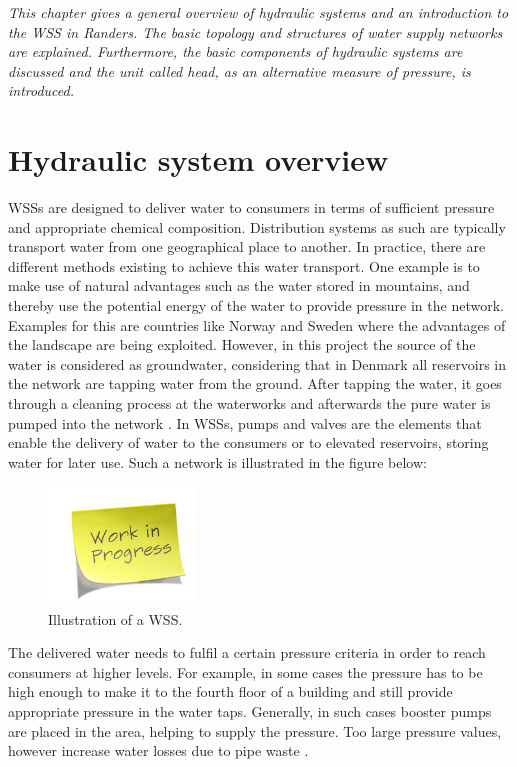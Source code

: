 \emph{This chapter gives a general overview of hydraulic systems and an introduction to the WSS in Randers. The basic topology and structures of water supply networks are explained. Furthermore, the basic components of hydraulic systems are discussed and the unit called head, as an alternative measure of pressure, is introduced.}

\section{Hydraulic system overview}
\label{hydraulic_system_overview}

WSSs are designed to deliver water to consumers in terms of sufficient pressure and appropriate chemical composition. Distribution systems as such are typically transport water from one geographical place to another. In practice, there are different methods existing to achieve this water transport. One example is to make use of natural advantages such as the water stored in mountains, and thereby use the potential energy of the water to provide pressure in the network. Examples for this are countries like Norway and Sweden where the advantages of the landscape are being exploited. However, in this project the source of the water is considered as groundwater, considering that in Denmark all reservoirs in the network are tapping water from the ground. After tapping the water, it goes through a cleaning process at the waterworks and afterwards the pure water is pumped into the network \cite{prahata}. In WSSs, pumps and valves are the elements that enable the delivery of water to the consumers or to elevated reservoirs, storing water for later use. Such a network is illustrated in the figure below: 

\begin{figure}[H]
\centering
\includegraphics[width=0.35\textwidth]{report/pictures/missingfigure}
\caption{Illustration of a WSS.}
\label{fig:WSS_example}
\end{figure}

The delivered water needs to fulfil a certain pressure criteria in order to reach consumers at higher levels. For example, in some cases the pressure has to be high enough to make it to the fourth floor of a building and still provide appropriate pressure in the water taps. Generally, in such cases booster pumps are placed in the area, helping to supply the pressure. Too large pressure values, however increase water losses due to pipe waste \cite{walski2003advanced}.

